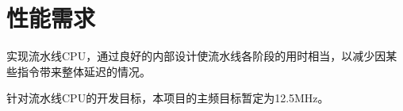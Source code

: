 \section{性能需求}
实现流水线CPU，通过良好的内部设计使流水线各阶段的用时相当，以减少因某些指令带来整体延迟的情况。

针对流水线CPU的开发目标，本项目的主频目标暂定为12.5MHz。


